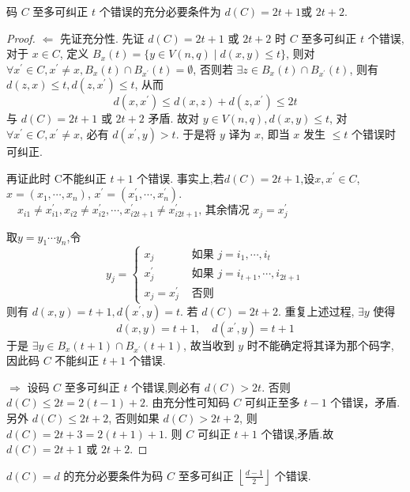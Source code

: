 \begin{theorem}
码 $ C $ 至多可纠正 $ t $ 个错误的充分必要条件为 $ d(C)=2 t+1 $或 $ 2 t+2 $.
\end{theorem}
\begin{proof}
$ \Leftarrow $ 先证充分性. 先证 $ d(C)=2 t+1 $ 或 $ 2 t+2 $ 时 $ C $ 至多可纠正 $ t $ 个错误, 对于 $ x \in C $, 定义 $ B_{x}(t)=\{y \in V(n, q) \mid d(x, y) \leq t\} $, 则对 $ \forall x^{\prime} \in C, x^{\prime} \neq x, B_{x}(t) \cap B_{x^{\prime}}(t)=\emptyset $, 否则若 $ \exists z \in B_{x}(t) \cap B_{x^{\prime}}(t) $, 则有 $ d(z, x) \leq t, d\left(z, x^{\prime}\right) \leq t $, 从而
$$
d\left(x, x^{\prime}\right) \leq d(x, z)+d\left(z, x^{\prime}\right) \leq 2 t
$$
与 $ d(C)=2 t+1 $ 或 $ 2 t+2 $ 矛盾.
故对 $ y \in V(n, q), d(x, y) \leq t $, 对 $ \forall x^{\prime} \in C, x^{\prime} \neq x $, 必有 $ d\left(x^{\prime}, y\right)>t $. 于是将 $ y $ 译为 $ x $, 即当 $ x $ 发生 $ \leq t $ 个错误时可纠正.

再证此时 C不能纠正 $ t+1 $ 个错误. 事实上,若$ d(C)=2 t+1$,设$ x, x^{\prime} \in C$, $x=\left(x_{1}, \cdots, x_{n}\right)$, $x^{\prime}=\left(x_{1}^{\prime}, \cdots, x_{n}^{\prime}\right)$.$\quad x_{i 1} \neq x_{i 1}^{\prime}, x_{i 2} \neq x_{i 2}^{\prime}, \cdots, x_{i 2 t+1}^{\prime} \neq x_{i 2 t+1}^{\prime} \text {, 其余情况 } x_{j}=x_{j}^{\prime}$

取$ y=y_{1} \cdots y_{n}$,令
$$
y_{j}=\left\{\begin{array}{ll}
x_{j} & \text { 如果 } j=i_{1}, \cdots, i_{t} \\
x_{j}^{\prime} & \text { 如果 } j=i_{t+1}, \cdots, i_{2 t+1} \\
x_{j}=x_{j}^{\prime} & \text { 否则 }
\end{array}\right.
$$
则有 $ d(x, y)=t+1, d\left(x^{\prime}, y\right)=t $.
若 $ d(C)=2 t+2 $. 重复上述过程, $ \exists y $ 使得
$$
d(x, y)=t+1, \quad d\left(x^{\prime}, y\right)=t+1
$$
于是 $ \exists y \in B_{x}(t+1) \cap B_{x^{\prime}}(t+1) $, 故当收到 $ y $ 时不能确定将其译为那个码字, 因此码 $ C $ 不能纠正 $ t+1 $ 个错误.

$ \Longrightarrow $ 设码 $ C $ 至多可纠正 $ t $ 个错误,则必有 $ d(C)>2 t $. 否则 $ d(C) \leq 2 t=2(t-1)+2 $. 由充分性可知码 $ C $ 可纠正至多 $ t-1 $ 个错误，矛盾. 另外 $ d(C) \leq 2 t+2 $, 否则如果 $ d(C)>2 t+2 $, 则 $ d(C)=2 t+3=2(t+1)+1 $. 则 $ C $ 可纠正 $ t+1 $ 个错误,矛盾.故 $ d(C)=2 t+1 $ 或 $ 2 t+2 $.
\end{proof}

\begin{corollary}
 $ d(C)=d $ 的充分必要条件为码 $ C $ 至多可纠正 $ \left\lfloor\frac{d-1}{2}\right\rfloor $ 个错误.
\end{corollary}

